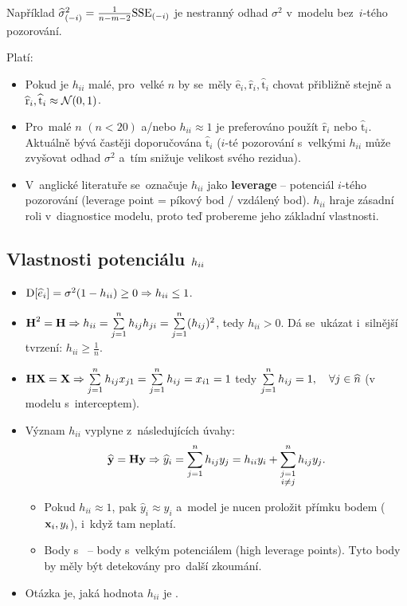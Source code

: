 Například $\widehat{\sigma}^2_{(-i)} = \frac{1}{n-m-2}\mathrm{SSE}_{(-i)}$ je nestranný odhad $\sigma^2$ v~modelu bez~$i$-tého pozorování.

\begin{remark}
Platí:
\begin{itemize}
\item Pokud je $h_{ii}$ malé, pro~velké $n$ by se~měly $\widehat{\text{e}}_i, \widehat{\text{r}}_i, \widehat{\mathrm{t}}_i$ chovat přibližně stejně a~$\widehat{\text{r}}_i,\widehat{\mathrm{t}}_i \approx \mathcal{N} (0, 1)$.
\item Pro~malé $n$ $(n < 20)$ a/nebo $h_{ii} \approx 1$ je preferováno použít $\widehat{\text{r}}_i$ nebo $\widehat{\mathrm{t}}_i$. Aktuálně bývá častěji doporučována $\widehat{\mathrm{t}}_i$ ($i$-té pozorování s~velkými $h_{ii}$ může zvyšovat odhad $\sigma^2$ a~tím snižuje velikost svého rezidua).
\item V~anglické literatuře se~označuje $h_{ii}$ jako \textbf{leverage} -- potenciál $i$-tého pozorování (leverage point = píkový bod / vzdálený bod). $h_{ii}$ hraje zásadní roli v~diagnostice modelu, proto teď probereme jeho základní vlastnosti.
\end{itemize}
\end{remark}

\subsection{Vlastnosti potenciálu $h_{ii}$}

\begin{itemize}
\item $\mathrm{D} [\widehat{e}_i] = \sigma^2 (1 - h_{ii}) \geq 0 \Rightarrow h_{ii} \leq 1$.
\item $\textbf{H}^2 = \textbf{H} \Rightarrow h_{ii} = \sum\limits_{j=1}^{n} h_{ij} h_{ji} = \sum\limits_{j=1}^{n} (h_{ij})^2$, tedy $h_{ii} > 0$. Dá se~ukázat i~silnější tvrzení: $h_{ii} \geq \frac{1}{n}$.
\item $\textbf{H}\mathbf{X} = \mathbf{X} \Rightarrow \sum\limits_{j=1}^{n} h_{ij} x_{j1} = \sum\limits_{j=1}^{n} h_{ij} = x_{i1} = 1$ tedy $\sum\limits_{j=1}^{n} h_{ij} = 1, \quad \forall j \in \widehat{n}$ (v modelu s~interceptem).
\item Význam $h_{ii}$ vyplyne z~následujících úvahy:
 $$
 \widehat{\mathbf{y}} = \textbf{H} \mathbf{y} \Rightarrow \widehat{y}_i = \sum\limits_{j=1}^{n} h_{ij}y_j = h_{ii} y_i + \sum\limits_{\substack{j = 1 \\ i\neq j}}^n h_{ij} y_j.
 $$
 \begin{itemize}
 	\item Pokud $h_{ii} \approx 1$, pak $\widehat{y}_i \approx y_i$ a~model je nucen proložit přímku bodem ($\mathbf{x}_i, y_i$), i~když tam neplatí.
 	\item Body s~ -- body s~velkým potenciálem (high leverage points). Tyto body by měly být detekovány pro~další zkoumání.
 \end{itemize}

 \item Otázka je, jaká hodnota $h_{ii}$ je .
\end{itemize}

